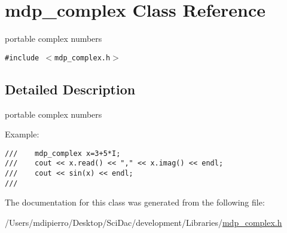 \hypertarget{classmdp__complex}{
\section{mdp\_\-complex Class Reference}
\label{classmdp__complex}
}
portable complex numbers  


{\tt \#include $<$mdp\_\-complex.h$>$}



\subsection{Detailed Description}
portable complex numbers 

Example: 

\footnotesize\begin{verbatim}
///    mdp_complex x=3+5*I;
///    cout << x.read() << "," << x.imag() << endl;
///    cout << sin(x) << endl;
/// \end{verbatim}
\normalsize
 

The documentation for this class was generated from the following file:\begin{CompactItemize}
\item 
/Users/mdipierro/Desktop/SciDac/development/Libraries/\hyperlink{mdp__complex_8h}{mdp\_\-complex.h}\end{CompactItemize}
